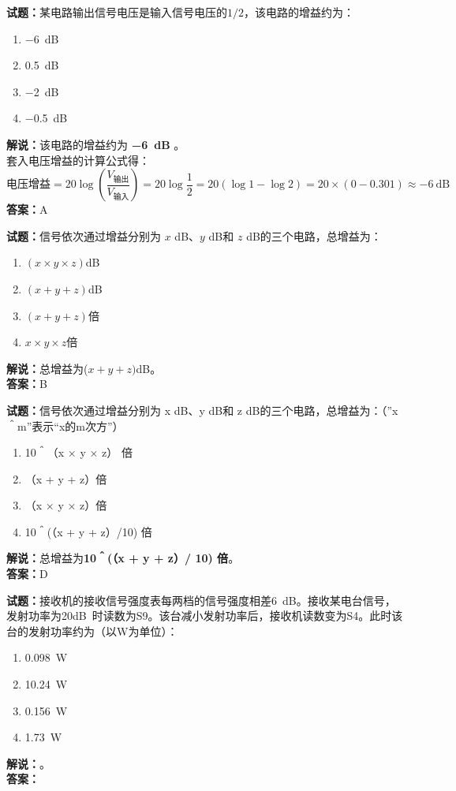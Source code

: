 \documentclass{ctexbook}
\begin{document}
\noindent\textbf{试题：}某电路输出信号电压是输入信号电压的\(1/2\)，该电路的增益约为：
\begin{enumerate}[leftmargin=3em]
  \item \SI{-6}{\dB}
  \item \SI{0.5}{\dB}
  \item \SI{-2}{\dB}
  \item \SI{-0.5}{\dB}
\end{enumerate}
\noindent\textbf{解说：}该电路的增益约为\textbf{ \SI{-6}{\dB} }。\\
套入电压增益的计算公式得：
$$\mbox{电压增益}=20 \log \left( {\frac{V_{ \mbox{输出} }}{V_{ \mbox{输入} }}} \right)=20 \log \frac{1}{2}=20 \left( \log 1 - \log 2 \right) = 20 \times \left( 0 - 0.301 \right) \approx -6 \ \mathrm{dB}$$
\noindent\textbf{答案：}A

\bigskip

\noindent\textbf{试题：}信号依次通过增益分别为 \(x\) \si{\dB}、\(y\) \si{\dB}和 \(z\) \si{\dB}的三个电路，总增益为：
\begin{enumerate}[leftmargin=3em]
  \item \((x \times y \times z)\)\si{\dB}
  \item \((x + y + z)\)\si{\dB}
  \item \((x + y + z)\)倍
  \item \(x \times y \times z\)倍
\end{enumerate}
\noindent\textbf{解说：}总增益为(\(x + y + z)\)\si{\dB}。\\\noindent\textbf{答案：}B

\bigskip

\noindent\textbf{试题：}信号依次通过增益分别为 x dB、y dB和 z dB的三个电路，总增益为：（”x＾m”表示“x的m次方”）
\begin{enumerate}[leftmargin=3em]
  \item 10＾（x × y × z） 倍
  \item （x + y + z）倍
  \item （x × y × z）倍
  \item 10＾(（x + y + z）/10) 倍
\end{enumerate}
\noindent\textbf{解说：}总增益为\textbf{10＾(（x + y + z）/ 10) 倍}。\\\noindent\textbf{答案：}D

\bigskip

\noindent\textbf{试题：}接收机的接收信号强度表每两档的信号强度相差\SI{6}{\dB}。接收某电台信号，发射功率为\num{20}\unit[qualifier-mode=combine]{\deci\bel{}}时读数为S9。该台减小发射功率后，接收机读数变为S4。此时该台的发射功率约为（以W为单位）：
\begin{enumerate}[leftmargin=3em]
  \item \SI{0.098}{\W}
  \item \SI{10.24}{\W}
  \item \SI{0.156}{\W}
  \item \SI{1.73}{\W}
\end{enumerate}
\noindent\textbf{解说：}\textbf{}。\\\noindent\textbf{答案：}
\end{document}
